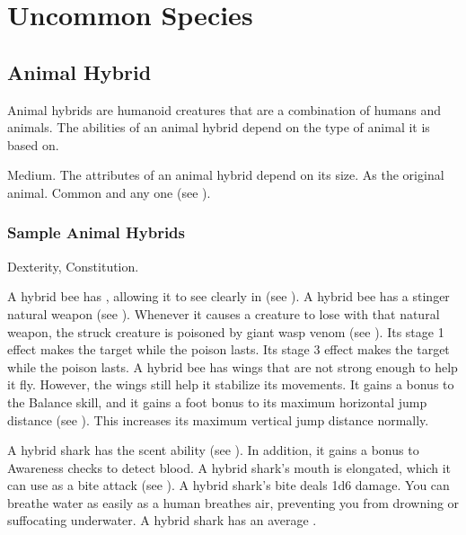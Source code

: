 \chapter{Uncommon Species}\label{Uncommon Species}

\section{Animal Hybrid}
  Animal hybrids are humanoid creatures that are a combination of humans and animals.
  The abilities of an animal hybrid depend on the type of animal it is based on.

   Medium.
   The attributes of an animal hybrid depend on its size.
   As the original animal.
   Common and any one  (see ).

  \subsection{Sample Animal Hybrids}


      Dexterity,  Constitution.
    \begin{itemize}
       A hybrid bee has , allowing it to see clearly in  (see ).
       A hybrid bee has a stinger natural weapon (see ).
        Whenever it causes a creature to lose  with that natural weapon, the struck creature is poisoned by giant wasp venom (see ).
        Its stage 1 effect makes the target \slowed while the poison lasts.
        Its stage 3 effect makes the target \immobilized while the poison lasts.
       A hybrid bee has wings that are not strong enough to help it fly.
        However, the wings still help it stabilize its movements.
        It gains a  bonus to the Balance skill, and it gains a  foot bonus to its maximum horizontal jump distance (see ).
        This increases its maximum vertical jump distance normally.
    \end{itemize}


    \begin{itemize}
       A hybrid shark has the scent ability (see ).
        In addition, it gains a  bonus to Awareness checks to detect blood.
       A hybrid shark's mouth is elongated, which it can use as a bite attack (see ).
        A hybrid shark's bite deals 1d6 damage.
       You can breathe water as easily as a human breathes air, preventing you from drowning or suffocating underwater.
       A hybrid shark has an average .
    \end{itemize}

